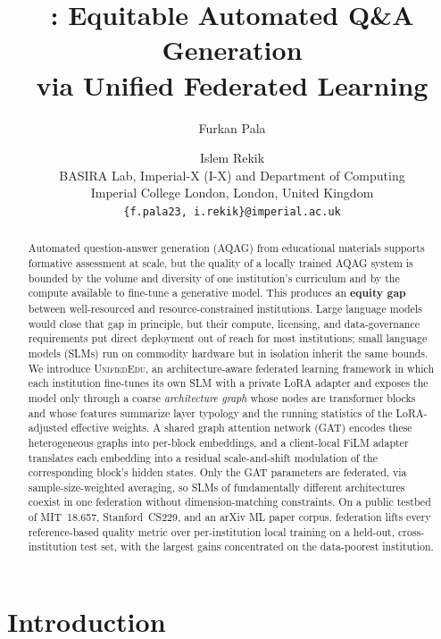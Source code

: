\documentclass[11pt]{article}
\title{\UniEdu{}: Equitable Automated Q\&A Generation\\
       via Unified Federated Learning}
\author{
  Furkan Pala \and
  \red{[co-authors TBC]} \and
  Islem Rekik \\
  BASIRA Lab, Imperial-X (I-X) and Department of Computing \\
  Imperial College London, London, United Kingdom \\
  \texttt{\{f.pala23, i.rekik\}@imperial.ac.uk}
}
\theoremstyle{plain}
\theoremstyle{definition}
\theoremstyle{remark}
\newcommand{\UniEdu}{\textsc{UnifiedEdu}}
\begin{document}
\maketitle

\begin{abstract}
Automated question-answer generation (AQAG) from
educational materials supports formative assessment
at scale, but the quality of a locally trained AQAG
system is bounded by the volume and diversity of
one institution's curriculum and by the compute
available to fine-tune a generative model. This
produces an \textbf{equity gap} between
well-resourced and resource-constrained
institutions. Large language models would close
that gap in principle, but their compute,
licensing, and data-governance requirements put
direct deployment out of reach for most
institutions; small language models (SLMs) run on
commodity hardware but in isolation inherit the
same bounds. We introduce \UniEdu{}, an
architecture-aware federated learning framework in
which each institution fine-tunes its own SLM with
a private LoRA adapter and exposes the model only
through a coarse \emph{architecture graph} whose
nodes are transformer blocks and whose features
summarize layer typology and the running statistics
of the LoRA-adjusted effective weights. A shared
graph attention network (GAT) encodes these
heterogeneous graphs into per-block embeddings, and
a client-local FiLM adapter translates each
embedding into a residual scale-and-shift
modulation of the corresponding block's hidden
states. Only the GAT parameters are federated, via
sample-size-weighted averaging, so SLMs of
fundamentally different architectures coexist in
one federation without dimension-matching
constraints. On a public testbed of MIT~18.657,
Stanford~CS229, and an arXiv ML paper corpus,
federation lifts every reference-based quality
metric over per-institution local training on a
held-out, cross-institution test set, with the
largest gains concentrated on the data-poorest
institution.
\end{abstract}

\section{Introduction}
\label{sec:introduction}
\end{document}
